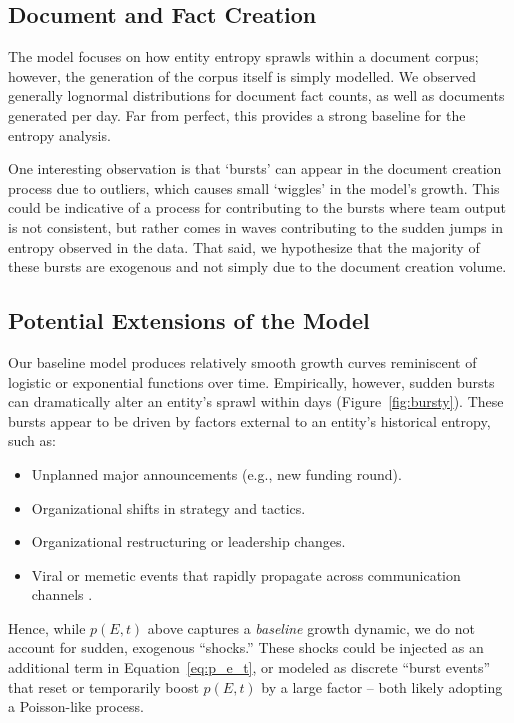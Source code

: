 \documentclass[11pt,a4paper]{article}
\begin{document}
\subsection{Document and Fact Creation}
\label{subsec:document_creation}

The model focuses on how entity entropy sprawls within a document corpus; however, the generation of the corpus itself is simply modelled. We observed generally lognormal distributions for document fact counts, as well as documents generated per day. Far from perfect, this provides a strong baseline for the entropy analysis.

One interesting observation is that `bursts' can appear in the document creation process due to outliers, which causes small `wiggles' in the model's growth. This could be indicative of a process for contributing to the bursts where team output is not consistent, but rather comes in waves contributing to the sudden jumps in entropy observed in the data. That said, we hypothesize that the majority of these bursts are exogenous and not simply due to the document creation volume.

\subsection{Potential Extensions of the Model}
\label{subsec:potential_extensions}

Our baseline model produces relatively smooth growth curves reminiscent of logistic or exponential functions over time. Empirically, however, sudden bursts can dramatically alter an entity’s sprawl within days (Figure~\ref{fig:bursty}). These bursts appear to be driven by factors external to an entity’s historical entropy, such as:
\begin{itemize}
    \item Unplanned major announcements (e.g., new funding round).
    \item Organizational shifts in strategy and tactics.
    \item Organizational restructuring or leadership changes.
    \item Viral or memetic events that rapidly propagate across communication channels \cite{shifman2013memes}.
\end{itemize}
Hence, while $p(E,t)$ above captures a \emph{baseline} growth dynamic, we do not account for sudden, exogenous “shocks.” These shocks could be injected as an additional term in Equation~\ref{eq:p_e_t}, or modeled as discrete “burst events” that reset or temporarily boost $p(E,t)$ by a large factor -- both likely adopting a Poisson-like process.
\end{document}

